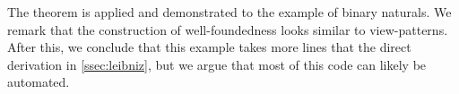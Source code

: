 \documentclass[10pt]{article}
\theoremstyle{plain}
\theoremstyle{definition}
\newcommand{\towrite}[1]{\todo[color=cyan]{#1}}
\begin{document}
The theorem is applied and demonstrated to the example of binary naturals. We remark that the construction of well-foundedness looks similar to view-patterns. After this, we conclude that this example takes more lines that the direct derivation in \autoref{ssec:leibniz}, but we argue that most of this code can likely be automated.

\towrite{Merge}

%
\end{document}
